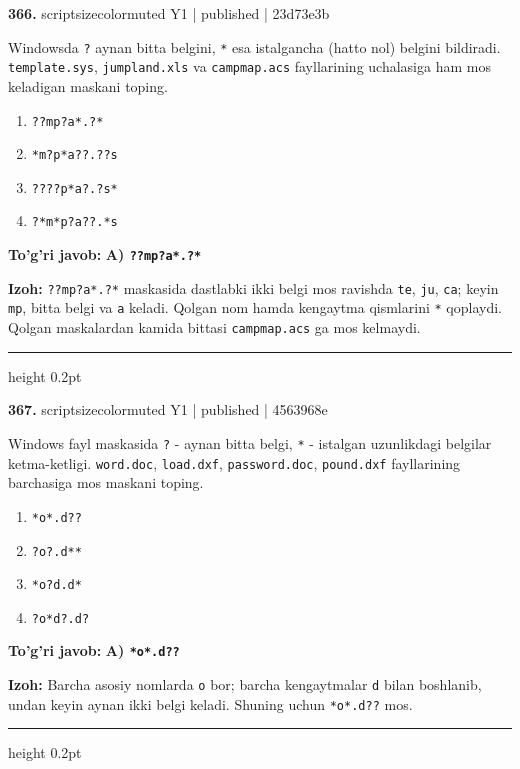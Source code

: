 \documentclass[10pt,a4paper]{article}
\begin{document}
{\bfseries\sffamily\color{ink} 366.} {scriptsizecolor{muted} Y1 | published | 23d73e3b}
\par
Windowsda \texttt{?} aynan bitta belgini, \texttt{*} esa istalgancha (hatto nol) belgini bildiradi. \texttt{template.sys}, \texttt{jumpland.xls} va \texttt{campmap.acs} fayllarining uchalasiga ham mos keladigan maskani toping.
\begin{enumerate}[label=\Alph*),leftmargin=9mm]
\item \texttt{??mp?a*.?*}
\item \texttt{*m?p*a??.??s}
\item \texttt{????p*a?.?s*}
\item \texttt{?*m*p?a??.*s}
\end{enumerate}
\begin{tcolorbox}[enhanced,breakable,colback=teal!4,colframe=teal!60!black,boxrule=0.45pt,arc=1.2mm,left=2.7mm,right=2.7mm,top=1.8mm,bottom=1.8mm,before skip=2mm,after skip=2mm]
{\bfseries\sffamily\color{teal}To'g'ri javob:} \textbf{A) \texttt{??mp?a*.?*}}
\par\smallskip
{\bfseries Izoh:} \texttt{??mp?a*.?*} maskasida dastlabki ikki belgi mos ravishda \texttt{te}, \texttt{ju}, \texttt{ca}; keyin \texttt{mp}, bitta belgi va \texttt{a} keladi. Qolgan nom hamda kengaytma qismlarini \texttt{*} qoplaydi. Qolgan maskalardan kamida bittasi \texttt{campmap.acs} ga mos kelmaydi.
\end{tcolorbox}
\vspace{2mm}\hrule height 0.2pt\vspace{3mm}

{\bfseries\sffamily\color{ink} 367.} {scriptsizecolor{muted} Y1 | published | 4563968e}
\par
Windows fayl maskasida \texttt{?} - aynan bitta belgi, \texttt{*} - istalgan uzunlikdagi belgilar ketma-ketligi. \texttt{word.doc}, \texttt{load.dxf}, \texttt{password.doc}, \texttt{pound.dxf} fayllarining barchasiga mos maskani toping.
\begin{enumerate}[label=\Alph*),leftmargin=9mm]
\item \texttt{*o*.d??}
\item \texttt{?o?.d**}
\item \texttt{*o?d.d*}
\item \texttt{?o*d?.d?}
\end{enumerate}
\begin{tcolorbox}[enhanced,breakable,colback=teal!4,colframe=teal!60!black,boxrule=0.45pt,arc=1.2mm,left=2.7mm,right=2.7mm,top=1.8mm,bottom=1.8mm,before skip=2mm,after skip=2mm]
{\bfseries\sffamily\color{teal}To'g'ri javob:} \textbf{A) \texttt{*o*.d??}}
\par\smallskip
{\bfseries Izoh:} Barcha asosiy nomlarda \texttt{o} bor; barcha kengaytmalar \texttt{d} bilan boshlanib, undan keyin aynan ikki belgi keladi. Shuning uchun \texttt{*o*.d??} mos.
\end{tcolorbox}
\vspace{2mm}\hrule height 0.2pt\vspace{3mm}
\end{document}
